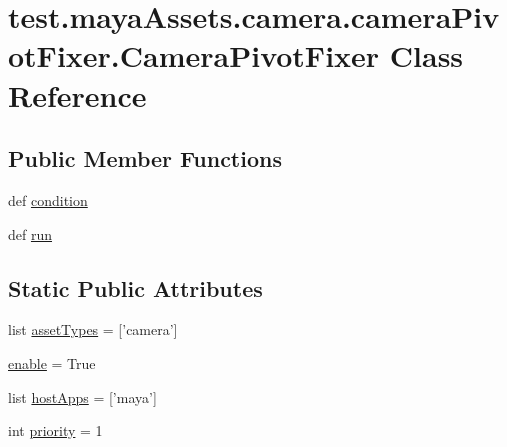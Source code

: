 \hypertarget{classtest_1_1mayaAssets_1_1camera_1_1cameraPivotFixer_1_1CameraPivotFixer}{\section{test.\-maya\-Assets.\-camera.\-camera\-Pivot\-Fixer.\-Camera\-Pivot\-Fixer \-Class \-Reference}
\label{db/d17/classtest_1_1mayaAssets_1_1camera_1_1cameraPivotFixer_1_1CameraPivotFixer}
}
\subsection*{\-Public \-Member \-Functions}
\begin{DoxyCompactItemize}
\item 
def \hyperlink{classtest_1_1mayaAssets_1_1camera_1_1cameraPivotFixer_1_1CameraPivotFixer_a378bd2e53d951e7bfe5ff4a75f0f57f7}{condition}
\item 
def \hyperlink{classtest_1_1mayaAssets_1_1camera_1_1cameraPivotFixer_1_1CameraPivotFixer_aaec0824bb471ba461cb11b9cdd484771}{run}
\end{DoxyCompactItemize}
\subsection*{\-Static \-Public \-Attributes}
\begin{DoxyCompactItemize}
\item 
list \hyperlink{classtest_1_1mayaAssets_1_1camera_1_1cameraPivotFixer_1_1CameraPivotFixer_ac03b8ef7932ea9ac919b2fe3739311cf}{asset\-Types} = \mbox{[}'camera'\mbox{]}
\item 
\hyperlink{classtest_1_1mayaAssets_1_1camera_1_1cameraPivotFixer_1_1CameraPivotFixer_af0488b2fcd2d1e76fde332e9e3adf12e}{enable} = \-True
\item 
list \hyperlink{classtest_1_1mayaAssets_1_1camera_1_1cameraPivotFixer_1_1CameraPivotFixer_ab25bfbe35796be98dfc70ae5e996f5bb}{host\-Apps} = \mbox{[}'maya'\mbox{]}
\item 
int \hyperlink{classtest_1_1mayaAssets_1_1camera_1_1cameraPivotFixer_1_1CameraPivotFixer_a86f4dde5e47b0fe9eb4bf1af1edbef77}{priority} = 1
\end{DoxyCompactItemize}


